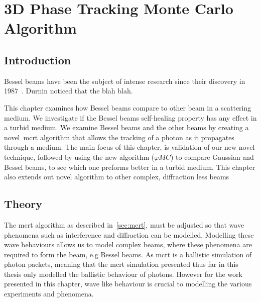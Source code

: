 \chapter{3D Phase Tracking Monte Carlo Algorithm}\label{sec:phase}

\section{Introduction}\label{sec:besintro}




Bessel beams have been the subject of intense research since their discovery in 1987~\cite{durnin1987diffraction,durnin1987exact}. Durnin noticed that the blah blah.

This chapter examines how Bessel beams compare to other beam in a scattering medium. 
We investigate if the Bessel beams self-healing property has any effect in a turbid medium.
We examine Bessel beams and the other beams by creating a novel~\gls*{mcrt} algorithm that allows the tracking of a photon as it propagates through a medium. 
The main focus of this chapter, is validation of our new novel technique, followed by using the new algorithm ($\varphi MC$) to compare Gaussian and Bessel beams, to see which one preforms better in a turbid medium. 
This chapter also extends out novel algorithm to other complex, diffraction less beams




\section{Theory}\label{sec:bestheory}

The \gls*{mcrt} algorithm as described in~\cref{sec:mcrt}, must be adjusted so that wave phenomena such as interference and diffraction can be modelled. 
Modelling these wave behaviours allows us to model complex beams, where these phenomena are required to form the beam, e.g Bessel beams. 
As \gls*{mcrt} is a ballistic simulation of photon packets, meaning that the \gls*{mcrt} simulation presented thus far in this thesis only modelled the ballistic behaviour of photons. 
However for the work presented in this chapter, wave like behaviour is crucial to modelling the various experiments and phenomena.

